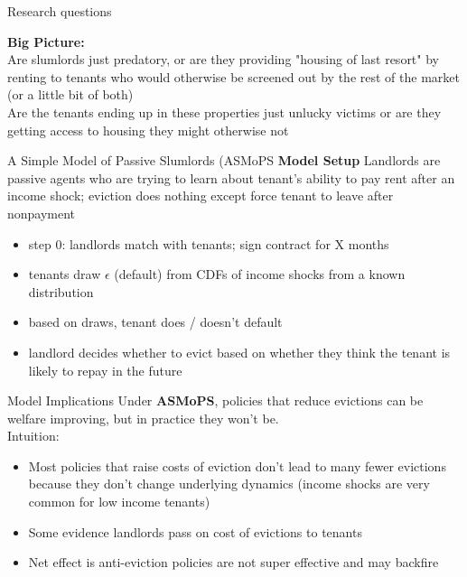 \documentclass[10pt, xcolor=dvipsnames]{beamer}
\begin{document}
\begin{frame}{Research questions}

\textbf{Big Picture:} \\
\vspace{0.5cm}
Are slumlords just predatory, or are they providing "housing of last resort" by renting to tenants who would otherwise be screened out by the rest of the market (or a little bit of both) \\
\vspace{0.5cm}
Are the tenants ending up in these properties just unlucky victims or are they getting access to housing they might otherwise not

\end{frame}

\begin{frame}{A Simple Model of Passive Slumlords (ASMoPS}
\textbf{Model Setup}
Landlords are passive agents who are trying to learn about tenant's ability to pay rent after an income shock; eviction does nothing except force tenant to leave after nonpayment
    \begin{itemize}
        \item step 0: landlords match with tenants; sign contract for X months
        \item tenants draw $\epsilon$ (default) from CDFs of income shocks from a known distribution
        \item based on draws, tenant does / doesn't default
        \item landlord decides whether to evict based on whether they think the tenant is likely to repay in the future
    \end{itemize}
\end{frame}

\begin{frame}{Model Implications}
Under \textbf{ASMoPS}, policies that reduce evictions can be welfare improving, but in practice they won't be.\\
\vspace{0.25cm}
Intuition: 
    \begin{itemize}
        \item Most policies that raise costs of eviction don't lead to many fewer evictions because they don't change underlying dynamics (income shocks are very common for low income tenants)
        \item Some evidence landlords pass on cost of evictions to tenants
        \item Net effect is anti-eviction policies are not super effective and may backfire
    \end{itemize}
\end{frame}
\end{document}
